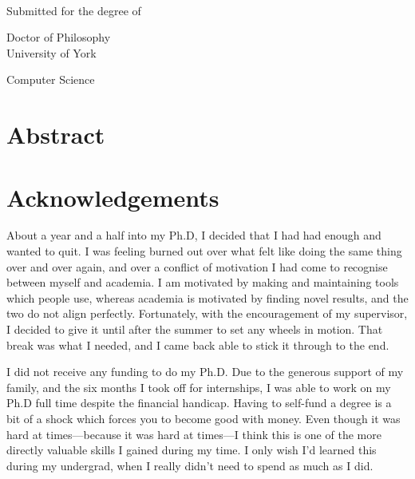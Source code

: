 \begin{titlepage}
  \begin{center}
    \makeatletter
    {\LARGE \@title}\\[1.5cm]
    {\large \@author}

    \vfill

    Submitted for the degree of\par
    Doctor of Philosophy\\[1.3cm]

    University of York\par
    Computer Science\\[1.3cm]

    \@date
    \makeatother
  \end{center}
\end{titlepage}

\chapter*{Abstract}
\blindtext

\makeatletter\renewcommand{}\makeatother
\tableofcontents
\listoffigures
\listoflistings
\listoftables

\chapter*{Acknowledgements}

About a year and a half into my Ph.D, I decided that I had had enough
and wanted to quit.  I was feeling burned out over what felt like
doing the same thing over and over again, and over a conflict of
motivation I had come to recognise between myself and academia.  I am
motivated by making and maintaining tools which people use, whereas
academia is motivated by finding novel results, and the two do not
align perfectly.  Fortunately, with the encouragement of my
supervisor, I decided to give it until after the summer to set any
wheels in motion.  That break was what I needed, and I came back able
to stick it through to the end.

I did not receive any funding to do my Ph.D.  Due to the generous
support of my family, and the six months I took off for internships, I
was able to work on my Ph.D full time despite the financial handicap.
Having to self-fund a degree is a bit of a shock which forces you to
become good with money.  Even though it was hard at times---because it
was hard at times---I think this is one of the more directly valuable
skills I gained during my time.  I only wish I'd learned this during
my undergrad, when I really didn't need to spend as much as I did.

